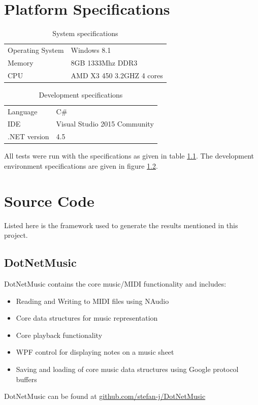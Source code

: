 \chapter{Platform Specifications}
\begin{table}[h!]
  \centering
  \caption{System specifications}
    \begin{tabular}{l|l}
    \toprule
    Operating System & Windows 8.1 \\
    Memory & 8GB 1333Mhz DDR3 \\
    CPU   & AMD X3 450 3.2GHZ 4 cores \\
    \bottomrule
    \end{tabular}%
  \label{tab:systemspecs}%
\end{table}%

\begin{table}[htbp]
  \centering
  \caption{Development specifications}
    \begin{tabular}{l|l}
    \toprule
    Language & C\# \\
    IDE   & Visual Studio 2015 Community \\
    .NET version & 4.5 \\
    \bottomrule
    \end{tabular}%
  \label{tab:languagespecs}%
\end{table}%


All tests were run with the specifications as given in table \ref{tab:systemspecs}. The development environment specifications are given in figure \ref{tab:languagespecs}.


\chapter{Source Code}
Listed here is the framework used to generate the results mentioned in this project.

\section{DotNetMusic}
DotNetMusic contains the core music/\ac{MIDI} functionality and includes:
\begin{itemize}
\item Reading and Writing to \ac{MIDI} files using NAudio
\item Core data structures for music representation
\item Core playback functionality
\item \ac{WPF} control for displaying notes on a music sheet
\item Saving and loading of core music data structures using Google protocol buffers
\end{itemize}
DotNetMusic can be found at \href{https://github.com/stefan-j/DotNetMusic}{github.com/stefan-j/DotNetMusic}

